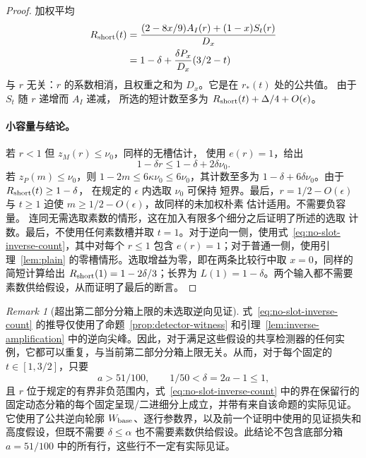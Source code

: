 \documentclass[11pt,a4paper]{article}
\numberwithin{equation}{section}
\numberwithin{figure}{section}
\theoremstyle{definition}
\theoremstyle{remark}
\newtheorem{remark}[theorem]{Remark}
\begin{document}
\begin{proof}
加权平均
\begin{equation}
 \begin{aligned}
 R_{\rm short}(t)
 &=\frac{(2-8x/9)A_I(r)+(1-x)S_t(r)}{D_x}\\
 &=1-\delta+\frac{\delta P_x}{D_x}(3/2-t)
 \end{aligned}
 \label{eq:short-crossing-count}
\end{equation}
与 \(r\) 无关：\(r\) 的系数相消，且权重之和为 \(D_x\)。它是在 \(r_*(t)\) 处的公共值。
由于 \(S_t\) 随 \(r\) 递增而 \(A_I\) 递减，
所选的短计数至多为 \(R_{\rm short}(t)+\Delta/4+O(\epsilon)\)。

\paragraph{小容量与结论。}
若 \(r<1\) 但 \(z_M(r)\le\nu_0\)，同样的无槽估计，
使用 \(e(r)=1\)，给出
\[
 1-\delta r\le1-\delta+2\delta\nu_0.
\]
若 \(z_P(m)\le\nu_0\)，则
\(1-2m\le6\kappa\nu_0\le6\nu_0\)，其计数至多为
\(1-\delta+6\delta\nu_0\)。由于 \(R_{\rm short}(t)\ge1-\delta\)，
在规定的 \(\epsilon\) 内选取 \(\nu_0\) 可保持
短界。最后，\(r=1/2-O(\epsilon)\) 与 \(t\ge1\)
迫使 \(m\ge1/2-O(\epsilon)\)，故同样的未加权朴素
估计适用。不需要负容量。
连同无需选取素数的情形，这在加入有限多个细分之后证明了所述的选取
计数。最后，不使用任何素数槽并取 \(t=1\)。对于逆向一侧，使用式~\eqref{eq:no-slot-inverse-count}，其中对每个 \(r\le1\) 包含 \(e(r)=1\)；对于普通一侧，使用引理~\ref{lem:plain} 的零槽情形。选取增益为零，即在两条比较行中取 \(x=0\)，同样的简短计算给出 \(R_{\rm short}(1)=1-2\delta/3\)；长界为 \(L(1)=1-\delta\)。两个输入都不需要素数供给假设，从而证明了最后的断言。
\end{proof}

\begin{remark}[超出第二部分分箱上限的未选取逆向见证]
式~\eqref{eq:no-slot-inverse-count} 的推导仅使用了命题~\ref{prop:detector-witness} 和引理~\ref{lem:inverse-amplification} 中的逆向尖峰。因此，对于满足这些假设的共享检测器的任何实例，它都可以重复，与当前第二部分分箱上限无关。从而，对于每个固定的 \(t\in[1,3/2]\)，只要
\[
 a>51/100,\qquad 1/50<\delta=2a-1\le1,
\]
且 \(r\) 位于规定的有界非负范围内，式~\eqref{eq:no-slot-inverse-count} 中的界在保留行的固定动态分箱的每个固定呈现/二进细分上成立，并带有来自该命题的实际见证。它使用了公共逆向轮廓 \(W_{\rm base}\)、逐行参数界，以及前一个证明中使用的见证损失和高度假设，但既不需要 \(\delta\le\alpha\) 也不需要素数供给假设。此结论不包含底部分箱 \(a=51/100\) 中的所有行，这些行不一定有实际见证。
\end{remark}
\end{document}
